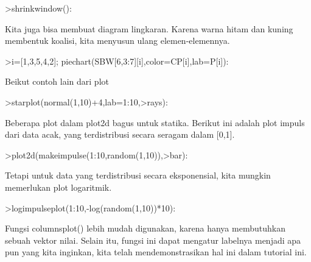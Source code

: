 \documentclass{article}
\begin{document}
\begin{eulernotebook}
\begin{eulerprompt}
>shrinkwindow():
\end{eulerprompt}
\begin{eulercomment}
Kita juga bisa membuat diagram lingkaran. Karena warna hitam dan
kuning membentuk koalisi, kita menyusun ulang elemen-elemennya.
\end{eulercomment}
\begin{eulerprompt}
>i=[1,3,5,4,2]; piechart(SBW[6,3:7][i],color=CP[i],lab=P[i]):
\end{eulerprompt}
\begin{eulercomment}
Beikut contoh lain dari plot
\end{eulercomment}
\begin{eulerprompt}
>starplot(normal(1,10)+4,lab=1:10,>rays):
\end{eulerprompt}
\begin{eulercomment}
Beberapa plot dalam plot2d bagus untuk statika. Berikut ini adalah
plot impuls dari data acak, yang terdistribusi secara seragam dalam
[0,1].
\end{eulercomment}
\begin{eulerprompt}
>plot2d(makeimpulse(1:10,random(1,10)),>bar):
\end{eulerprompt}
\begin{eulercomment}
Tetapi untuk data yang terdistribusi secara eksponensial, kita mungkin
memerlukan plot logaritmik.
\end{eulercomment}
\begin{eulerprompt}
>logimpulseplot(1:10,-log(random(1,10))*10):
\end{eulerprompt}
\begin{eulercomment}
Fungsi columnsplot() lebih mudah digunakan, karena hanya membutuhkan
sebuah vektor nilai. Selain itu, fungsi ini dapat mengatur labelnya
menjadi apa pun yang kita inginkan, kita telah mendemonstrasikan hal
ini dalam tutorial ini.


\end{eulercomment}
\end{eulernotebook}
\end{document}
